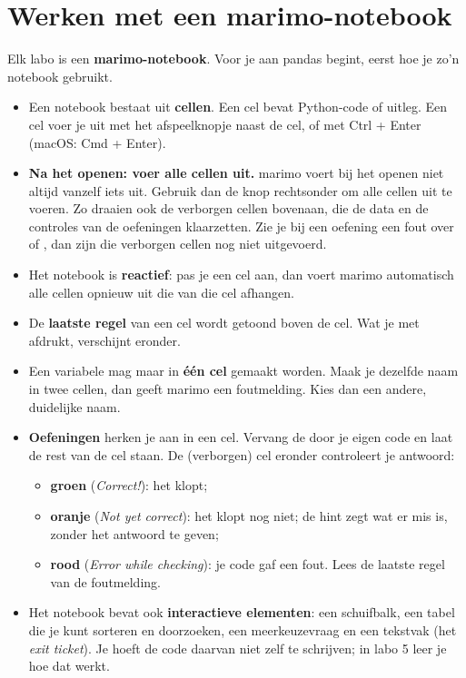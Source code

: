 \documentclass[11pt,a4paper]{article}
\begin{document}
\section{Werken met een marimo-notebook}

Elk labo is een \textbf{marimo-notebook}. Voor je aan pandas begint, eerst
hoe je zo'n notebook gebruikt.

\begin{itemize}
  \item Een notebook bestaat uit \textbf{cellen}. Een cel bevat Python-code
        of uitleg. Een cel voer je uit met het afspeelknopje naast de cel,
        of met Ctrl + Enter (macOS: Cmd + Enter).
  \item \textbf{Na het openen: voer alle cellen uit.} marimo voert bij het
        openen niet altijd vanzelf iets uit. Gebruik dan de knop rechtsonder
        om alle cellen uit te voeren. Zo draaien ook de verborgen cellen
        bovenaan, die de data en de controles van de oefeningen klaarzetten.
        Zie je bij een oefening een fout over  of
        , dan zijn die verborgen cellen nog niet uitgevoerd.
  \item Het notebook is \textbf{reactief}: pas je een cel aan, dan voert
        marimo automatisch alle cellen opnieuw uit die van die cel afhangen.
  \item De \textbf{laatste regel} van een cel wordt getoond boven de cel.
        Wat je met  afdrukt, verschijnt eronder.
  \item Een variabele mag maar in \textbf{één cel} gemaakt worden. Maak je
        dezelfde naam in twee cellen, dan geeft marimo een foutmelding. Kies
        dan een andere, duidelijke naam.
  \item \textbf{Oefeningen} herken je aan  in een cel. Vervang de
         door je eigen code en laat de rest van de cel staan. De
        (verborgen) cel eronder controleert je antwoord:
        \begin{itemize}
          \item \textbf{groen} (\emph{Correct!}): het klopt;
          \item \textbf{oranje} (\emph{Not yet correct}): het klopt nog niet;
                de hint zegt wat er mis is, zonder het antwoord te geven;
          \item \textbf{rood} (\emph{Error while checking}): je code gaf een
                fout. Lees de laatste regel van de foutmelding.
        \end{itemize}
  \item Het notebook bevat ook \textbf{interactieve elementen}: een
        schuifbalk, een tabel die je kunt sorteren en doorzoeken, een
        meerkeuzevraag en een tekstvak (het \emph{exit ticket}). Je hoeft de
        code daarvan niet zelf te schrijven; in labo 5 leer je hoe dat werkt.
\end{itemize}
\end{document}
